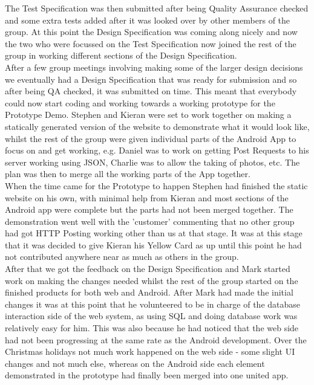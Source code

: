 \documentclass{article}
\begin{document}
		The Test Specification was then submitted after being Quality Assurance checked and some extra tests added after it was looked over by other members of the group. At this point the Design Specification was coming along nicely and now the two who were focussed on the Test Specification now joined the rest of the group in working different sections of the Design Specification. \\

		After a few group meetings involving making some of the larger design decisions we eventually had a Design Specification that was ready for submission and so after being QA checked, it was submitted on time. This meant that everybody could now start coding and working towards a working prototype for the Prototype Demo. Stephen and Kieran were set to work together on making a statically generated version of the website to demonstrate what it would look like, whilst the rest of the group were given individual parts of the Android App to focus on and get working, e.g. Daniel was to work on getting Post Requests to his server working using JSON, Charlie was to allow the taking of photos, etc. The plan was then to merge all the working parts of the App together. \\

		When the time came for the Prototype to happen Stephen had finished the static website on his own, with minimal help from Kieran and most sections of the Android app were complete but the parts had not been merged together. The demonstration went well with the 'customer' commenting that no other group had got HTTP Posting working other than us at that stage. It was at this stage that it was decided to give Kieran his Yellow Card as up until this point he had not contributed anywhere near as much as others in the group. \\

		After that we got the feedback on the Design Specification and Mark started work on making the changes needed whilst the rest of the group started on the finished products for both web and Android. After Mark had made the initial changes it was at this point that he volunteered to be in charge of the database interaction side of the web system, as using SQL and doing database work was relatively easy for him. This was also because he had noticed that the web side had not been progressing at the same rate as the Android development. Over the Christmas holidays not much work happened on the web side - some slight UI changes and not much else, whereas on the Android side each element demonstrated in the prototype had finally been merged into one united app. \\
\end{document}
